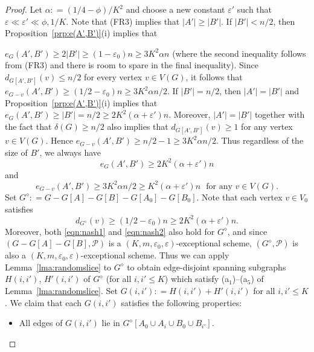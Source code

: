 \documentclass{memo-l}
\def\COMMENT#1{}
\def\eps{\varepsilon}
\def\epszero{\eps_0}
\numberwithin{section}{chapter}
\numberwithin{equation}{section}
\numberwithin{firstthm}{section}
\numberwithin{figure}{section}
\begin{document}
\begin{proof}
Let $\alpha : = (1/4 - \phi)/K^2$ and choose a new constant $\eps'$ such that $\eps  \ll \eps'\ll \phi,  1/K$.
Note that (FR3) implies that $|A'| \ge |B'|$.
If $|B'| < n/2$, then Proposition~\ref{prp:e(A',B')}(i) implies that%
    \COMMENT{ This clearly holds if $|B'| \le n/2-1$. But if $n$ is odd and $|B'|=\lfloor n/2\rfloor$ then $\delta(G) \ge \lceil n/2\rceil$
so we have that $e_{G}(A',B') \ge 2|B'|$ in this case as well.}
$e_{G}(A',B') \ge 2|B'| \ge (1- \epszero )n \ge 3 K^2 \alpha n$ (where the second inequality follows from (FR3)
and there is room to spare in the final inequality).
Since $d_{G[A',B']}(v)\le n/2$ for every vertex $v \in V(G)$, it follows that $e_{G- v}(A',B') \ge (1/2- \epszero)n \ge 3K^2\alpha n/2$.
If $|B'| = n/2$, then $|A'|  = |B'|$ and Proposition~\ref{prp:e(A',B')}(i) implies that $e_{G}(A',B') \ge |B'| = n/2 \ge 2 K^2( \alpha + \eps')n$.
Moreover, $|A'|  = |B'|$ together with the fact that $\delta(G) \ge n/2 $ also implies that $d_{G[A',B']}(v) \ge 1$ for any vertex $v \in V(G)$. 
Hence $e_{G- v}(A',B') \ge n/2 - 1\ge 3K^2\alpha n/2$. Thus regardless of the size of $B'$, we always have
\begin{equation}\label{eqn:nash1}
	e_{G}(A',B') \ge  2 K^2( \alpha + \eps') n
\end{equation}
and
\begin{equation}\label{eqn:nash2}
	e_{G- v}(A',B') \ge 3K^2\alpha n/2 \ge K^2(\alpha + \eps') n \ \ \  \textrm{for any $v \in V(G)$.}
\end{equation}
Set $G^{\diamond} : = G - G[A] - G[B] - G[A_0] - G[B_0]$.
Note that each vertex $v \in V_0$ satisfies
\begin{equation}\label{eq:degGdiamond}
d_{G^{\diamond}}(v) \ge (1/2 - \epszero) n \ge 2K^2( \alpha + \eps') n.
\end{equation}
Moreover, both \eqref{eqn:nash1} and \eqref{eqn:nash2} also hold for $G^{\diamond}$, and since $(G - G[A] - G[B],\mathcal{P})$ is a $(K,m, \epszero, \eps)$-exceptional scheme,
$(G^{\diamond}, \mathcal{P})$ is also a $(K,m, \epszero, \eps)$-exceptional scheme. 
Thus we can apply Lemma~\ref{lma:randomslice} to $G^{\diamond}$ to obtain edge-disjoint spanning subgraphs $H(i,i')$, $H'(i,i')$ of
$G^{\diamond}$ (for all $i,i' \le K$) which satisfy (a$_1$)--(a$_5$) of Lemma~\ref{lma:randomslice}.
Set $G(i,i') : = H(i,i') + H'(i,i')$ for all $i,i' \le K$.
We claim that each $G(i,i')$ satisfies the following properties:
\begin{itemize}
\item[{\rm (i)}] All edges of $G(i,i')$ lie in $G^{\diamond}[A_0 \cup A_i \cup B_0 \cup B_{i'}]$.

\end{itemize}
\end{proof}
\end{document}
